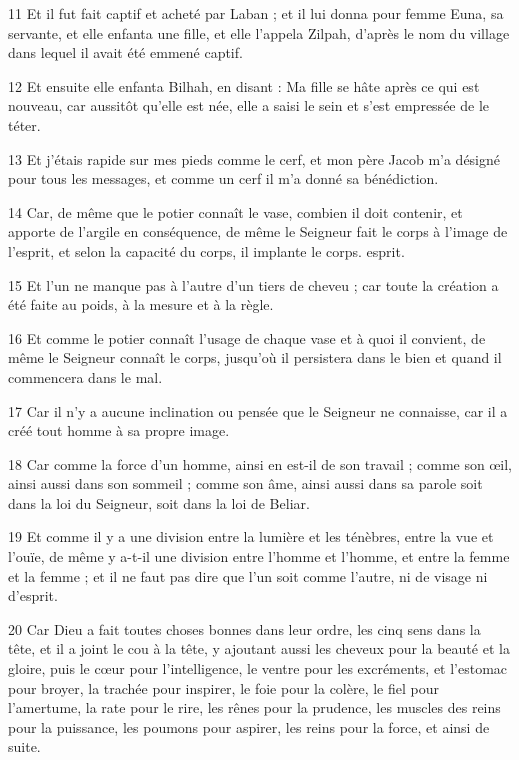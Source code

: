 \par 11 Et il fut fait captif et acheté par Laban ; et il lui donna pour femme Euna, sa servante, et elle enfanta une fille, et elle l'appela Zilpah, d'après le nom du village dans lequel il avait été emmené captif.

\par 12 Et ensuite elle enfanta Bilhah, en disant : Ma fille se hâte après ce qui est nouveau, car aussitôt qu'elle est née, elle a saisi le sein et s'est empressée de le téter.

\par 13 Et j'étais rapide sur mes pieds comme le cerf, et mon père Jacob m'a désigné pour tous les messages, et comme un cerf il m'a donné sa bénédiction.

\par 14 Car, de même que le potier connaît le vase, combien il doit contenir, et apporte de l'argile en conséquence, de même le Seigneur fait le corps à l'image de l'esprit, et selon la capacité du corps, il implante le corps. esprit.

\par 15 Et l'un ne manque pas à l'autre d'un tiers de cheveu ; car toute la création a été faite au poids, à la mesure et à la règle.

\par 16 Et comme le potier connaît l'usage de chaque vase et à quoi il convient, de même le Seigneur connaît le corps, jusqu'où il persistera dans le bien et quand il commencera dans le mal.

\par 17 Car il n'y a aucune inclination ou pensée que le Seigneur ne connaisse, car il a créé tout homme à sa propre image.

\par 18 Car comme la force d'un homme, ainsi en est-il de son travail ; comme son œil, ainsi aussi dans son sommeil ; comme son âme, ainsi aussi dans sa parole soit dans la loi du Seigneur, soit dans la loi de Beliar.

\par 19 Et comme il y a une division entre la lumière et les ténèbres, entre la vue et l'ouïe, de même y a-t-il une division entre l'homme et l'homme, et entre la femme et la femme ; et il ne faut pas dire que l’un soit comme l’autre, ni de visage ni d’esprit.

\par 20 Car Dieu a fait toutes choses bonnes dans leur ordre, les cinq sens dans la tête, et il a joint le cou à la tête, y ajoutant aussi les cheveux pour la beauté et la gloire, puis le cœur pour l'intelligence, le ventre pour les excréments, et l'estomac pour broyer, la trachée pour inspirer, le foie pour la colère, le fiel pour l'amertume, la rate pour le rire, les rênes pour la prudence, les muscles des reins pour la puissance, les poumons pour aspirer, les reins pour la force, et ainsi de suite.

